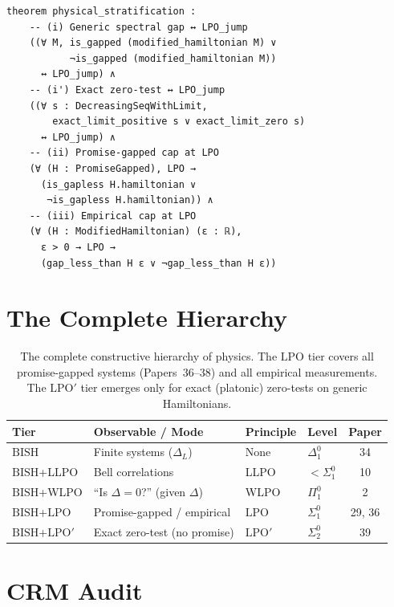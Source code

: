 \documentclass[11pt,a4paper]{article}
\theoremstyle{plain}
\theoremstyle{definition}
\newcommand{\LPO}{\ensuremath{\mathrm{LPO}}}
\newcommand{\LPOj}{\ensuremath{\mathrm{LPO'}}}
\newcommand{\BISH}{\ensuremath{\mathrm{BISH}}}
\begin{document}
\begin{lstlisting}[caption={Physical stratification: \texttt{Stratification.lean}}]
theorem physical_stratification :
    -- (i) Generic spectral gap ↔ LPO_jump
    ((∀ M, is_gapped (modified_hamiltonian M) ∨
           ¬is_gapped (modified_hamiltonian M))
      ↔ LPO_jump) ∧
    -- (i') Exact zero-test ↔ LPO_jump
    ((∀ s : DecreasingSeqWithLimit,
        exact_limit_positive s ∨ exact_limit_zero s)
      ↔ LPO_jump) ∧
    -- (ii) Promise-gapped cap at LPO
    (∀ (H : PromiseGapped), LPO →
      (is_gapless H.hamiltonian ∨
       ¬is_gapless H.hamiltonian)) ∧
    -- (iii) Empirical cap at LPO
    (∀ (H : ModifiedHamiltonian) (ε : ℝ),
      ε > 0 → LPO →
      (gap_less_than H ε ∨ ¬gap_less_than H ε))
\end{lstlisting}

\section{The Complete Hierarchy}\label{sec:hierarchy}

\begin{table}[ht]
\centering
\begin{tabular}{@{}llllc@{}}
\toprule
\textbf{Tier} & \textbf{Observable / Mode} & \textbf{Principle} &
\textbf{Level} & \textbf{Paper} \\
\midrule
$\BISH$ & Finite systems ($\Delta_L$) & None & $\Delta_1^0$ & 34 \\
$\BISH$+LLPO & Bell correlations & LLPO & $<\Sigma_1^0$ & 10 \\
$\BISH$+WLPO & ``Is $\Delta=0$?'' (given $\Delta$) & WLPO & $\Pi_1^0$ & 2 \\
$\BISH$+$\LPO$ & Promise-gapped / empirical & $\LPO$ & $\Sigma_1^0$ & 29, 36 \\
$\BISH$+$\LPOj$ & Exact zero-test (no promise) & $\LPOj$ & $\Sigma_2^0$ & 39 \\
\bottomrule
\end{tabular}
\caption{The complete constructive hierarchy of physics.
The $\LPO$ tier covers all promise-gapped systems (Papers~36--38)
and all empirical measurements.  The $\LPOj$ tier emerges only
for exact (platonic) zero-tests on generic Hamiltonians.}
\label{tab:hierarchy}
\end{table}

\section{CRM Audit}\label{sec:audit}
\end{document}
